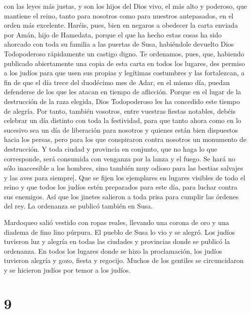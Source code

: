 con las leyes más justas, y son los hijos del Dios vivo, el más alto y
poderoso, que mantiene el reino, tanto para nosotros como para nuestros
antepasados, en el orden más excelente. Haréis, pues, bien en negaros a
obedecer la carta enviada por Amán, hijo de Hamedata, porque el que ha
hecho estas cosas ha sido ahorcado con toda su familia a las puertas de
Susa, habiéndole devuelto Dios Todopoderoso rápidamente un castigo
digno. Te ordenamos, pues, que, habiendo publicado abiertamente una
copia de esta carta en todos los lugares, des permiso a los judíos para
que usen sus propias y legítimas costumbres y las fortalezcan, a fin de
que el día trece del duodécimo mes de Adar, en el mismo día, puedan
defenderse de los que les atacan en tiempo de aflicción. Porque en el
lugar de la destrucción de la raza elegida, Dios Todopoderoso les ha
concedido este tiempo de alegría. Por tanto, también vosotros, entre
vuestras fiestas notables, debéis celebrar un día distinto con toda la
festividad, para que tanto ahora como en lo sucesivo sea un día de
liberación para nosotros y quienes están bien dispuestos hacia los
persas, pero para los que conspiraron contra nosotros un monumento de
destrucción. Y toda ciudad y provincia en conjunto, que no haga lo que
corresponde, será consumida con venganza por la lanza y el fuego. Se
hará no sólo inaccesible a los hombres, sino también muy odioso para las
bestias salvajes y las aves para siempre{]}. Que se fijen los ejemplares
en lugares visibles de todo el reino y que todos los judíos estén
preparados para este día, para luchar contra sus enemigos.
 Así que los jinetes salieron a toda prisa para cumplir
las órdenes del rey. La ordenanza se publicó también en Susa.

 Mardoqueo salió vestido con ropas reales, llevando una
corona de oro y una diadema de fino lino púrpura. El pueblo de Susa lo
vio y se alegró.  Los judíos tuvieron luz y alegría
 en todas las ciudades y provincias donde se publicó la
ordenanza. En todos los lugares donde se hizo la proclamación, los
judíos tuvieron alegría y gozo, fiesta y regocijo. Muchos de los
gentiles se circuncidaron y se hicieron judíos por temor a los judíos.

\hypertarget{section-8}{%
\section{9}\label{section-8}}

